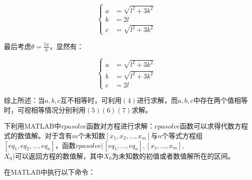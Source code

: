 \documentclass[a4paper,10.5pt]{ctexart}
\begin{document}
\begin{equation}
\left\{
\begin{aligned}
a&=\sqrt{l^2+3k^2}\\
b&=2l\\
c&=\sqrt{l^2+3k^2}
\end{aligned}
\right.
\end{equation}

\par 最后考虑$\theta=\frac{5\pi}{6}$，显然有：

\begin{equation}
\left\{
\begin{aligned}
a&=\sqrt{l^2+3k^2}\\
b&=\sqrt{l^2+3k^2}\\
c&=2l
\end{aligned}
\right.
\end{equation}
\par 综上所述：当$a,b,c$互不相等时，可利用$(4)$进行求解，而$a,b,c$中存在两个值相等时，可视相等情况分别利用$(5)(6)(7)$求解。
\par 下利用MATLAB中$vpasolve$函数对方程进行求解：$vpasolve$函数可以求得代数方程式的数值解。对于含有$m$个未知数$[x_1,x_2,...,x_m]$与$n$个等式方程组$[eq_1,eq_2,...,eq_n]$，函数$vpasolve([eq_1,...,eq_n],[x_1,...,x_m],$\\$X_0)$可以返回方程的数值解，其中$X_0$为未知数的初值或者数值解所在的区间。
\par 在MATLAB中执行以下命令：
\end{document}
